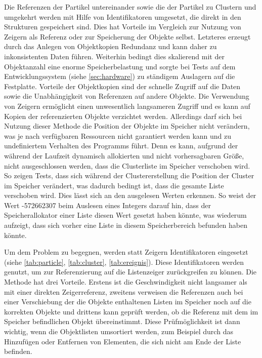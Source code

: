 Die Referenzen der Partikel untereinander sowie die der Partikel zu Clustern und umgekehrt werden mit Hilfe von Identifikatoren umgesetzt, die direkt in den Strukturen gespeichert sind. Dies hat Vorteile im Vergleich zur Nutzung von Zeigern als Referenz oder zur Speicherung der Objekte selbst. Letzteres erzeugt durch das Anlegen von Objektkopien Redundanz und kann daher zu inkonsistenten Daten führen. Weiterhin bedingt dies skalierend mit der Objektanzahl eine enorme Speicherbelastung und sorgte bei Tests auf dem Entwicklungssystem (siehe \autoref{sec:hardware}) zu ständigem Auslagern auf die Festplatte. Vorteile der Objektkopien sind der schnelle Zugriff auf die Daten sowie die Unabhängigkeit von Referenzen auf andere Objekte.
Die Verwendung von Zeigern ermöglicht einen unwesentlich langsameren Zugriff und es kann auf Kopien der referenzierten Objekte verzichtet werden. Allerdings darf sich bei Nutzung dieser Methode die Position der Objekte im Speicher nicht verändern, was je nach verfügbaren Ressourcen nicht garantiert werden kann und zu undefiniertem Verhalten des Programms führt. Denn es kann, aufgrund der während der Laufzeit dynamisch allokierten und nicht vorhersagbaren Größe, nicht ausgeschlossen werden, dass die Clusterliste im Speicher verschoben wird. So zeigen Tests, dass sich während der Clustererstellung die Position der Cluster im Speicher verändert, was dadurch bedingt ist, dass die gesamte Liste verschoben wird. Dies lässt sich an den ausgelesen Werten erkennen. So weist der Wert -572662307 beim Auslesen eines Integers darauf hin, dass der Speicherallokator einer Liste diesen Wert gesetzt haben könnte, was wiederum aufzeigt, dass sich vorher eine Liste in diesem Speicherbereich befunden haben könnte.

Um dem Problem zu begegnen, werden statt Zeigern Identifikatoren eingesetzt (siehe \autoref{tab:particle}, \autoref{tab:cluster}, \autoref{tab:ereignis}).
Diese Identifikatoren werden genutzt, um zur Referenzierung auf die Listenzeiger zurückgreifen zu können. Die Methode hat drei Vorteile. Erstens ist die Geschwindigkeit nicht langsamer als mit einer direkten Zeigerreferenz, zweitens verweisen die Referenzen auch bei einer Verschiebung der die Objekte enthaltenen Listen im Speicher noch auf die korrekten Objekte und drittens kann geprüft werden, ob die Referenz mit dem im Speicher befindlichen Objekt übereinstimmt. Diese Prüfmöglichkeit ist dann wichtig, wenn die Objektlisten umsortiert werden, zum Beispiel durch das Hinzufügen oder Entfernen von Elementen, die sich nicht am Ende der Liste befinden.


